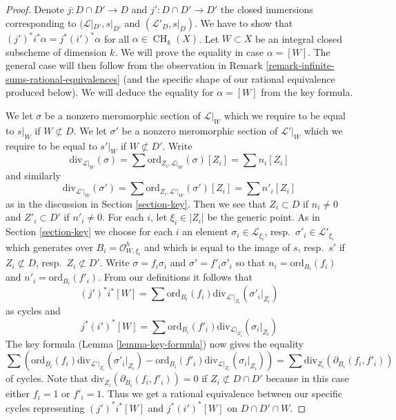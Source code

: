 \documentclass[10pt,a4paper]{amsart}
\theoremstyle{plain}
\theoremstyle{definition}
\theoremstyle{remark}
\numberwithin{equation}{subsection}
\def\CH{\mathop{\mathrm{CH}}\nolimits}
\begin{document}
\begin{proof}
Denote $j : D \cap D' \to D$ and $j' : D \cap D' \to D'$ the closed
immersions corresponding to $(\mathcal{L}|_{D'}, s|_{D'}$ and
$(\mathcal{L}'_D, s|_D)$. We have to show that
$(j')^*i^*\alpha = j^* (i')^*\alpha$ for all $\alpha \in \CH_k(X)$.
Let $W \subset X$ be an integral closed subscheme of dimension $k$.
We will prove the equality in case $\alpha = [W]$.
The general case will then follow from the observation in
Remark \ref{remark-infinite-sums-rational-equivalences}
(and the specific shape of our rational equivalence produced below).
We will deduce the equality for $\alpha = [W]$ from the key formula.

\medskip\noindent
We let $\sigma$ be a nonzero meromorphic section of $\mathcal{L}|_W$
which we require to be equal to $s|_W$ if $W \not \subset D$.
We let $\sigma'$ be a nonzero meromorphic section of $\mathcal{L}'|_W$
which we require to be equal to $s'|_W$ if $W \not \subset D'$.
Write
$$
\text{div}_{\mathcal{L}|_W}(\sigma) =
\sum \text{ord}_{Z_i, \mathcal{L}|_W}(\sigma)[Z_i] = \sum n_i[Z_i]
$$
and similarly
$$
\text{div}_{\mathcal{L}'|_W}(\sigma') =
\sum \text{ord}_{Z_i, \mathcal{L}'|_W}(\sigma')[Z_i] = \sum n'_i[Z_i]
$$
as in the discussion in Section \ref{section-key}.
Then we see that $Z_i \subset D$ if $n_i \not = 0$ and
$Z'_i \subset D'$ if $n'_i \not = 0$. For each $i$, let $\xi_i \in |Z_i|$
be the generic point. As in Section \ref{section-key} we choose
for each $i$ an element
$\sigma_i \in \mathcal{L}_{\xi_i}$, resp.\ $\sigma'_i \in \mathcal{L}'_{\xi_i}$
which generates over $B_i = \mathcal{O}_{W, \xi_i}^h$
and which is equal to the image of
$s$, resp.\ $s'$ if $Z_i \not \subset D$, resp.\ $Z_i \not \subset D'$.
Write $\sigma = f_i \sigma_i$ and $\sigma' = f'_i\sigma'_i$ so that
$n_i = \text{ord}_{B_i}(f_i)$ and
$n'_i = \text{ord}_{B_i}(f'_i)$.
From our definitions it follows that
$$
(j')^*i^*[W] =
\sum \text{ord}_{B_i}(f_i) \text{div}_{\mathcal{L}'|_{Z_i}}(\sigma'_i|_{Z_i})
$$
as cycles and
$$
j^*(i')^*[W] =
\sum \text{ord}_{B_i}(f'_i) \text{div}_{\mathcal{L}|_{Z_i}}(\sigma_i|_{Z_i})
$$
The key formula (Lemma \ref{lemma-key-formula}) now gives the equality
$$
\sum \left(
\text{ord}_{B_i}(f_i) \text{div}_{\mathcal{L}'|_{Z_i}}(\sigma'_i|_{Z_i}) -
\text{ord}_{B_i}(f'_i) \text{div}_{\mathcal{L}|_{Z_i}}(\sigma_i|_{Z_i})
\right) =
\sum \text{div}_{Z_i}(\partial_{B_i}(f_i, f'_i))
$$
of cycles. Note that $\text{div}_{Z_i}(\partial_{B_i}(f_i, f'_i)) = 0$ if
$Z_i \not \subset D \cap D'$ because in this case either $f_i = 1$
or $f'_i = 1$. Thus we get a rational equivalence between our specific
cycles representing $(j')^*i^*[W]$ and $j^*(i')^*[W]$ on $D \cap D' \cap W$.
\end{proof}
\end{document}
